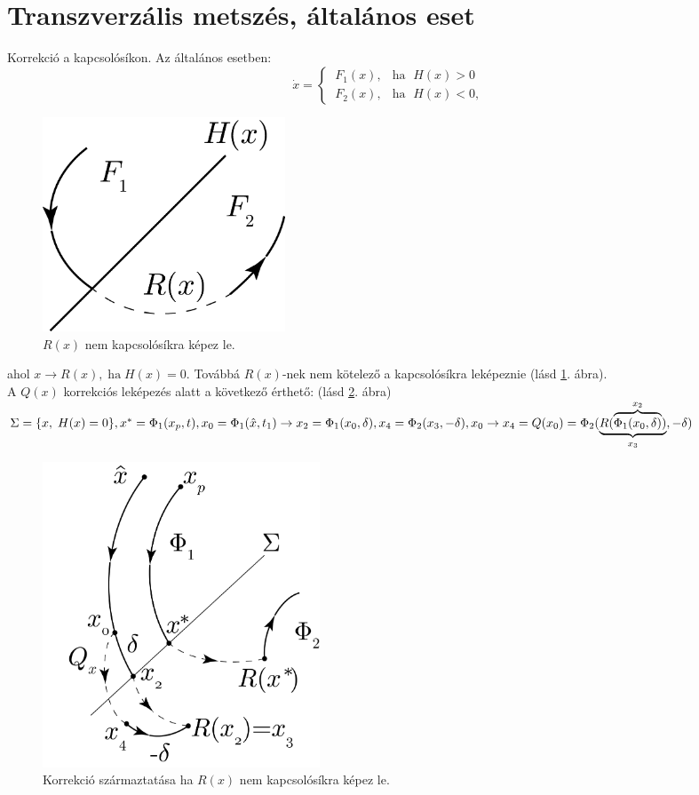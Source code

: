 \section{Transzverzális metszés, általános eset}


Korrekció a kapcsolósíkon. Az általános esetben:
\[
{\dot{x}} = \begin{cases}
   {\ F}_1(x), & \text{ha } \; H({ x})>0 \\
   {\ F}_2(x), & \text{ha } \; H({ x})<0, 
 \end{cases}
\]


\begin{figure}
	\centering
	\includegraphics[width=0.35\textwidth]{graphics/5_1.png}
	\caption{$R(x)$ nem kapcsolósíkra képez le.}\label{fig:501}
\end{figure} 


ahol ${x}\rightarrow R({x}),\; \text{ha}\; H(x)=0.$ Továbbá $R(x)$-nek nem kötelező a kapcsolósíkra leképeznie (lásd \ref{fig:501}. ábra).\\

 A $Q(x)$ korrekciós leképezés alatt a következő érthető: (lásd \ref{fig:502}. ábra)
\noindent
 $\Sigma = \lbrace x,\; H(x)=0 \rbrace,\\
 x^*=\Phi_1(x_p,t),\\
 x_0=\Phi_1{(\hat{x},t_1)} \rightarrow x_2=\Phi_1(x_0,\delta),\\
 x_4=\Phi_2(x_3,-\delta),\\
 x_0 \rightarrow x_4=Q(x_0)=\Phi_2(\underbrace{R(\overbrace{\Phi_1(x_0,\delta)}^{x_2})}_{x_3},-\delta)$

\begin{figure}[ht]
\centering
\includegraphics[width=0.4\textwidth]{graphics/5_2.png}
\caption{Korrekció származtatása ha $R(x)$ nem kapcsolósíkra képez le.}\label{fig:502}
\end{figure}

